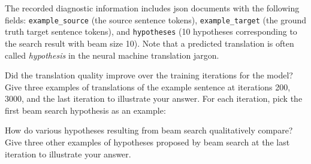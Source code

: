 \begin{parts}
    The recorded diagnostic information includes json documents with the following fields: \texttt{example\_source} (the source sentence tokens), \texttt{example\_target} (the ground truth target sentence tokens), and \texttt{hypotheses} (10 hypotheses corresponding to the search result with beam size 10). Note that a predicted translation is often called \emph{hypothesis} in the neural machine translation jargon.

    \begin{subparts}
        \subpart[2] Did the translation quality improve over the training iterations for the model? Give three examples of translations of the example sentence at iterations 200, 3000, and the last iteration to illustrate your answer. For each iteration, pick the first beam search hypothesis as an example:
        \\
        
        
        
        \subpart[2] How do various hypotheses resulting from beam search qualitatively compare? Give three other examples of hypotheses proposed by beam search at the last iteration to illustrate your answer.
        \\
        

\end{subparts}
\end{parts}

